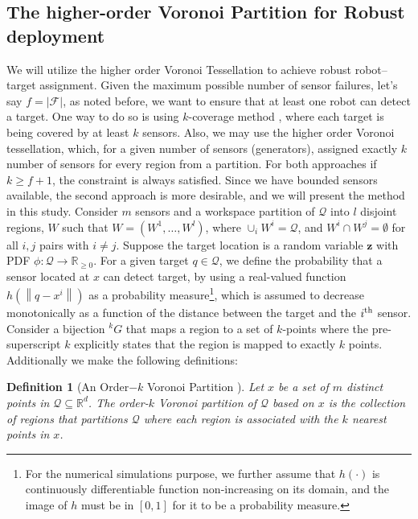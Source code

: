 \documentclass[letterpaper, 10 pt, conference]{ieeeconf}
\newtheorem{definition}{Definition}[section]
\newcommand{\HJ}[1]{{\color{black}{#1}}}
\begin{document}
\subsection{The higher-order Voronoi Partition for Robust deployment}
We will utilize the higher order Voronoi Tessellation to achieve robust robot--target assignment.
Given the maximum possible number of sensor failures, let's say $f = \left|\mathcal{F} \right|$, as noted before, we want to ensure that at least one robot can detect a target.
One way to do so is using $k$-coverage method \cite{kumar2004k}, where each target is being covered by at least $k$ sensors. 
Also, we may use the higher order Voronoi tessellation, which, for a given number of sensors (generators), assigned exactly $k$ number of sensors for every region from a partition.
For both approaches if $k \geq f+1$, the constraint is always satisfied. 
Since we have bounded sensors available, the second approach is more desirable, and we will present the method in this study.
Consider $m$ sensors and a workspace partition of $\mathcal{Q}$ into $l$ disjoint regions, $W$ such that $W = (W^1,\dots,W^l)$, where $\cup_i W^i = \mathcal{Q}$, and $W^i \cap W^j = \emptyset$ for all $i,j$ pairs with $i \neq j$. 
Suppose the target location is a random variable $\bm{z}$ with PDF $\phi:\mathcal{Q} \rightarrow \mathbb{R}_{\geq 0}$.
For a given target $q \in \mathcal{Q}$, we define the probability that a sensor located at $x$ can detect target, by using a real-valued function $h(\left\|q - x^i\right\|)$ as a probability measure\footnote{For the numerical simulations purpose, we further assume that $h(\cdot)$ is continuously differentiable function non-increasing on its domain, and the image of $h$ must be in $[0,1]$ for it to be a probability measure.}, which is assumed to decrease monotonically as a function of the distance between the target and the $i^{\textup{th}}$ sensor. 
Consider a bijection ${}^kG$ that maps a region to a set of $k$-points where the pre-superscript $k$ explicitly states that the region is mapped to exactly $k$ points.
Additionally we make the following definitions:
\begin{definition}[An Order$-k$ Voronoi Partition \cite{shamos1975closest}]
	Let $x$ be a set of $m$ distinct points in $\mathcal{Q}\subseteq \mathbb{R}^d$. 
	The \emph{order-$k$ Voronoi partition of $\mathcal{Q}$ based on $x$}\HJ{, namely ${}^kV$,} is the collection of regions that partitions $\mathcal{Q}$ where each region is associated with the $k$ nearest points in $x$.
	\label{orderk}
\end{definition}
\end{document}
